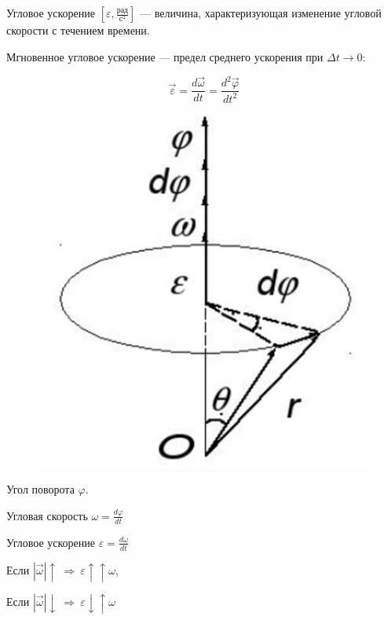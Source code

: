 \begin{definition}
    Угловое ускорение $[\varepsilon, \frac{рад}{с^2}]$ — величина, характеризующая изменение угловой скорости с течением времени.
\end{definition}

\begin{definition}
    Мгновенное угловое ускорение — предел среднего ускорения при $\Delta t\to0$:

    $$\vec\varepsilon=\frac{d\vec\omega}{dt}=\frac{d^2\vec\varphi}{dt^2}$$
\end{definition}

\begin{figure}
    \centering
    \includegraphics[width=\linewidth]{imgs/q2i1.png}
\end{figure}

Угол поворота $\varphi$.

Угловая скорость $\omega=\frac{d\varphi}{dt}$

Угловое ускорение $\varepsilon=\frac{d\omega}{dt}$

Если $|\vec\omega|\uparrow\ \Rightarrow\ \varepsilon\uparrow\uparrow\omega$,

Если $|\vec\omega|\downarrow\ \Rightarrow\ \varepsilon\downarrow\uparrow\omega$


